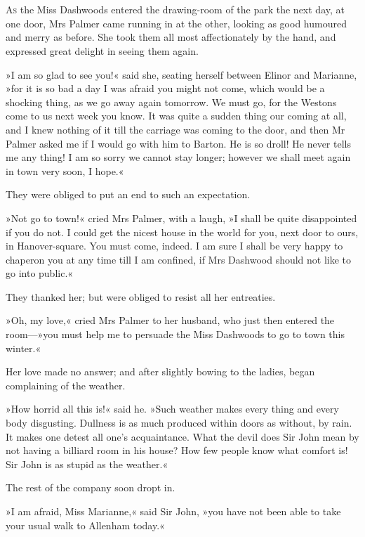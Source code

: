\chapter[Chapter \thechapter]{}
\lettrine[lines=4,lraise=0.3]{A}{s} the Miss Dashwoods entered the drawing-room of the park the next day, at one door, Mrs Palmer came running in at the other, looking as good humoured and merry as before. She took them all most affectionately by the hand, and expressed great delight in seeing them again.

»I am so glad to see you!« said she, seating herself between Elinor and Marianne, »for it is so bad a day I was afraid you might not come, which would be a shocking thing, as we go away again tomorrow. We must go, for the Westons come to us next week you know. It was quite a sudden thing our coming at all, and I knew nothing of it till the carriage was coming to the door, and then Mr Palmer asked me if I would go with him to Barton. He is so droll! He never tells me any thing! I am so sorry we cannot stay longer; however we shall meet again in town very soon, I hope.«

They were obliged to put an end to such an expectation.

»Not go to town!« cried Mrs Palmer, with a laugh, »I shall be quite disappointed if you do not. I could get the nicest house in the world for you, next door to ours, in Hanover-square. You must come, indeed. I am sure I shall be very happy to chaperon you at any time till I am confined, if Mrs Dashwood should not like to go into public.«

They thanked her; but were obliged to resist all her entreaties.

»Oh, my love,« cried Mrs Palmer to her husband, who just then entered the room—»you must help me to persuade the Miss Dashwoods to go to town this winter.«

Her love made no answer; and after slightly bowing to the ladies, began complaining of the weather.

»How horrid all this is!« said he. »Such weather makes every thing and every body disgusting. Dullness is as much produced within doors as without, by rain. It makes one detest all one’s acquaintance. What the devil does Sir John mean by not having a billiard room in his house? How few people know what comfort is! Sir John is as stupid as the weather.«

The rest of the company soon dropt in.

»I am afraid, Miss Marianne,« said Sir John, »you have not been able to take your usual walk to Allenham today.«

